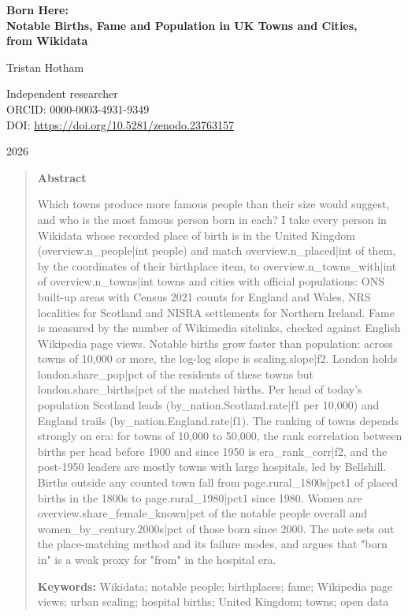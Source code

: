\documentclass[11pt,a4paper]{article}
\begin{document}
\begin{center}
{\Large\bfseries Born Here:\\[2pt] Notable Births, Fame and Population in UK Towns and Cities,\\[2pt] from Wikidata\par}
\vspace{1.2em}
{\large Tristan Hotham\par}
\vspace{0.3em}
{\small Independent researcher\\
ORCID: 0000-0003-4931-9349\\
DOI: \href{https://doi.org/10.5281/zenodo.23763157}{https://doi.org/10.5281/zenodo.23763157}\par}
\vspace{0.8em}
2026
\end{center}

\begin{quote}
\small
\begin{center}\textbf{Abstract}\end{center}
Which towns produce more famous people than their size would suggest, and who is the most famous person born in each? I take every person in Wikidata whose recorded place of birth is in the United Kingdom ({{overview.n_people|int}} people) and match {{overview.n_placed|int}} of them, by the coordinates of their birthplace item, to {{overview.n_towns_with|int}} of {{overview.n_towns|int}} towns and cities with official populations: ONS built-up areas with Census 2021 counts for England and Wales, NRS localities for Scotland and NISRA settlements for Northern Ireland. Fame is measured by the number of Wikimedia sitelinks, checked against English Wikipedia page views. Notable births grow faster than population: across towns of 10,000 or more, the log-log slope is {{scaling.slope|f2}}. London holds {{london.share_pop|pct}} of the residents of these towns but {{london.share_births|pct}} of the matched births. Per head of today's population Scotland leads ({{by_nation.Scotland.rate|f1}} per 10,000) and England trails ({{by_nation.England.rate|f1}}). The ranking of towns depends strongly on era: for towns of 10,000 to 50,000, the rank correlation between births per head before 1900 and since 1950 is {{era_rank_corr|f2}}, and the post-1950 leaders are mostly towns with large hospitals, led by Bellshill. Births outside any counted town fall from {{page.rural_1800s|pct1}} of placed births in the 1800s to {{page.rural_1980|pct1}} since 1980. Women are {{overview.share_female_known|pct}} of the notable people overall and {{women_by_century.2000s|pct}} of those born since 2000. The note sets out the place-matching method and its failure modes, and argues that "born in" is a weak proxy for "from" in the hospital era.

\textbf{Keywords:} Wikidata; notable people; birthplaces; fame; Wikipedia page views; urban scaling; hospital births; United Kingdom; towns; open data
\end{quote}
\end{document}
